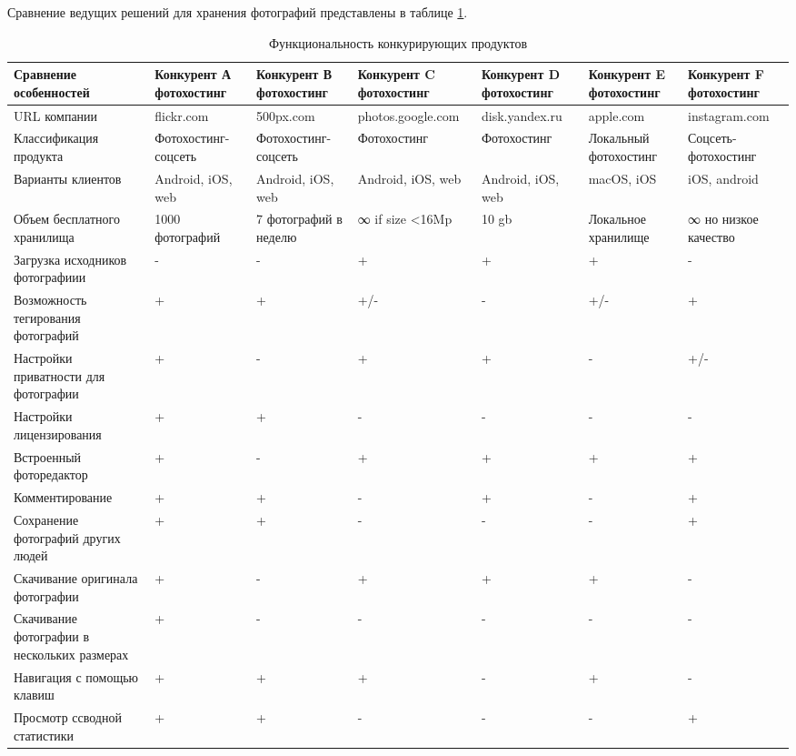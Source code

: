 Сравнение ведущих решений для хранения фотографий представлены в таблице \ref{comp-table}.
\begin{landscape}
\begin{table}[H]
  \caption{Функциональность конкурирующих продуктов}\label{comp-table}
  \begin{spacing}{1}
  \smalltable
  \begin{tabular}{|p{5.8cm}|p{2.8cm}|p{2.8cm}|p{2.8cm}|p{2.6cm}|p{2.8cm}|p{2.7cm}|} %
  \hline Сравнение особенностей & Конкурент А фотохостинг & Конкурент В фотохостинг & Конкурент C фотохостинг & Конкурент D фотохостинг & Конкурент E фотохостинг & Конкурент F фотохостинг \\ 
  \hline URL компании & flickr.com & 500px.com & photos.google.com & disk.yandex.ru & apple.com & instagram.com \\ 
  \hline Классификация продукта & Фотохостинг-соцсеть & Фотохостинг-соцсеть & Фотохостинг & Фотохостинг & Локальный фотохостинг & Соцсеть-фотохостинг \\ 
  \hline Варианты клиентов & Android, iOS, web & Android, iOS, web & Android, iOS, web & Android, iOS, web & macOS, iOS & iOS, android \\ 
  \hline Объем бесплатного хранилища & 1000 фотографий & 7 фотографий в неделю & ∞ if size <16Mp & 10 gb & Локальное хранилище & ∞ но низкое качество \\ 
  \hline Загрузка исходников фотографиии & - & - & + & + & + & - \\ 
  \hline Возможность тегирования фотографий & + & + & +/- & - & +/- & + \\ 
  \hline Настройки приватности для фотографии & + & - & + & + & - & +/- \\ 
  \hline Настройки лицензирования & + & + & - & - & - & - \\ 
  \hline Встроенный фоторедактор & + & - & + & + & + & + \\ 
  \hline Комментирование & + & + & - & + & - & + \\ 
  \hline Сохранение фотографий других людей & + & + & - & - & - & + \\ 
  \hline Скачивание оригинала фотографии & + & - & + & + & + & - \\ 
  \hline Скачивание фотографии в нескольких размерах & + & - & - & - & - & - \\ 
  \hline Навигация с помощью клавиш & + & + & + & - & + & - \\ 
  \hline Просмотр ссводной статистики & + & + & - & - & - & + \\ 

\end{tabular}
\end{spacing}
\end{table}
\end{landscape}
